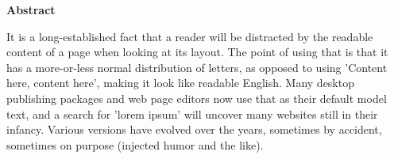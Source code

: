 \thispagestyle{empty}
\vspace*{1cm}
{}
\begin{center}
\textbf{Abstract}
\end{center}
\vspace*{1.5cm}
\noindent 

It is a long-established fact that a reader will be distracted by the readable content of a page when looking at its layout. The point of using that is that it has a more-or-less normal distribution of letters, as opposed to using 'Content here, content here', making it look like readable English. Many desktop publishing packages and web page editors now use that as their default model text, and a search for 'lorem ipsum' will uncover many websites still in their infancy. Various versions have evolved over the years, sometimes by accident, sometimes on purpose (injected humor and the like).